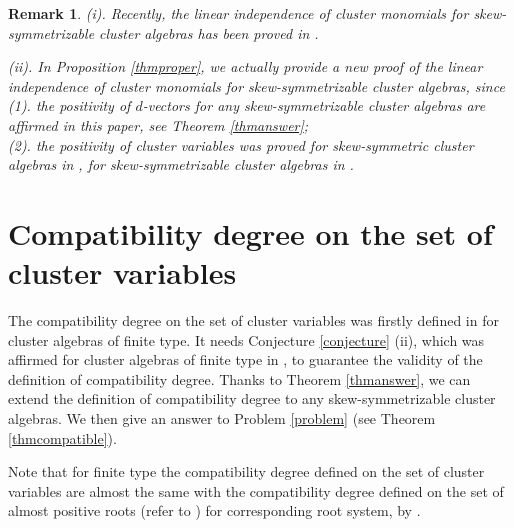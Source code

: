 \documentclass[14pt]{amsart}
\newtheorem{Remark}[Theorem]{Remark}
\begin{document}
\begin{Remark}\label{rmknew}
(i).  Recently, the linear independence of cluster monomials for skew-symmetrizable cluster algebras has been proved in \cite{GHKK}.

(ii).  In Proposition \ref{thmproper}, we actually provide a new proof of the linear independence of cluster monomials  for skew-symmetrizable cluster algebras, since
\\
(1). the positivity of $d$-vectors for any skew-symmetrizable cluster algebras are affirmed  in this paper, see Theorem \ref{thmanswer};
\\
(2).  the positivity of cluster variables was proved for skew-symmetric cluster algebras in \cite{LS}, for skew-symmetrizable cluster algebras in \cite{GHKK}.
\end{Remark}



\vspace{5mm}





\section{Compatibility degree on the set of cluster variables}
The compatibility degree on the set of cluster variables was firstly defined in \cite{CP} for cluster algebras of finite type. It needs Conjecture \ref{conjecture} (ii), which was affirmed for cluster algebras of finite type in \cite{CP},  to guarantee the validity of the definition of compatibility degree. Thanks to Theorem \ref{thmanswer}, we can extend the definition of  compatibility degree to any skew-symmetrizable cluster algebras.  We then give an answer to Problem \ref{problem} (see Theorem \ref{thmcompatible}).

Note that for finite type the compatibility degree defined on the set of cluster variables are almost the same with the compatibility degree defined on the set of almost positive roots (refer to \cite{FZ0,FZ1}) for corresponding root system, by \cite[Theorem 3.1]{CP}.
\end{document}
